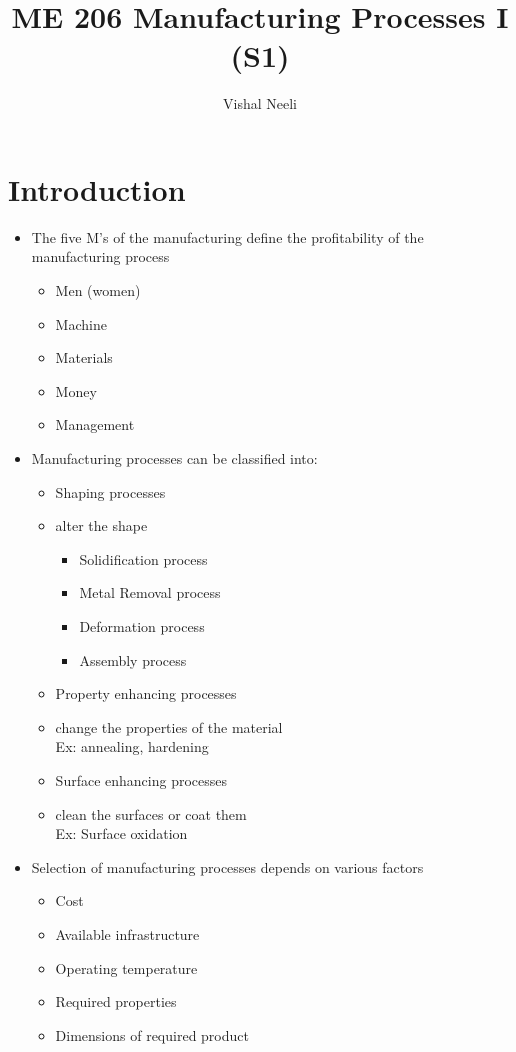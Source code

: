 \documentclass{article}
\title{ME 206 Manufacturing Processes I (S1)}
\author{Vishal Neeli}
\begin{document}
\maketitle

\section{Introduction}

\begin{itemize}
	\item The five M's of the manufacturing define the profitability of the manufacturing process
	\begin{itemize}
		\item Men (women)
		\item Machine
		\item Materials
		\item Money 
		\item Management

	\end{itemize}

	\item Manufacturing processes can be classified into:
	\begin{itemize}
		\item Shaping processes \item alter the shape
		\begin{itemize}
			\item Solidification process
			\item Metal Removal process
			\item Deformation process
			\item Assembly process
		\end{itemize}
		\item Property enhancing processes \item change the properties of the material\\
		Ex: annealing, hardening
		\item Surface enhancing processes \item clean the surfaces or coat them\\
		Ex: Surface oxidation
	\end{itemize}


	\item Selection of manufacturing processes depends on various factors
	\begin{itemize}
		\item Cost 
		\item Available infrastructure
		\item Operating temperature
		\item Required properties
		\item Dimensions of required product
	\end{itemize}

\end{itemize}
\end{document}
